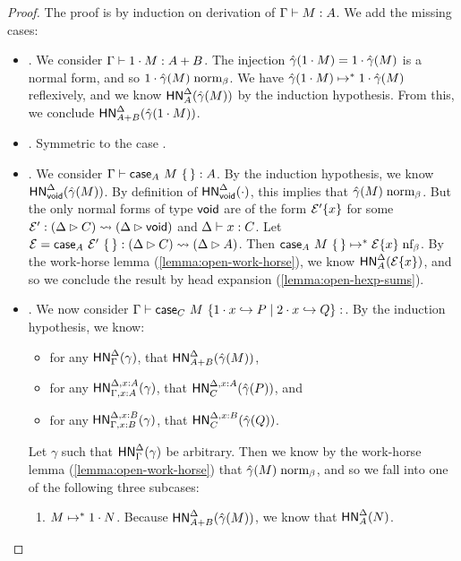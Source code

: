 \documentclass{article}
\begin{document}
\begin{proof}
  The proof is by induction on derivation of $\Gamma \vdash M : A$.
  We add the missing cases:
  \begin{itemize}
  \item {}. We consider $\Gamma \vdash 1\cdot M : A + B$.
    The injection $\hat\gamma(1\cdot M) = 1\cdot\hat\gamma(M)$ is a normal form, and so $1\cdot\hat\gamma(M) \mathrel{\text{norm}_\beta}$.
    We have $\hat\gamma(1\cdot M) \mapsto^* 1\cdot\hat\gamma(M)$ reflexively, and we know $\mathsf{HN}^{\Delta}_{A}(\hat\gamma(M))$ by the induction hypothesis.
    From this, we conclude $\mathsf{HN}^{\Delta}_{A + B}(\hat\gamma({1\cdot M}))$.
  \item {}. Symmetric to the case .
  \item {}. We consider $\Gamma \vdash \mathsf{case}_{A}\ M\ \{\,\} : A$.
    By the induction hypothesis, we know $\mathsf{HN}^{\Delta}_{\mathsf{void}}(\hat\gamma(M))$.
    By definition of $\mathsf{HN}^{\Delta}_{\mathsf{void}}(\cdot)$, this implies that $\hat\gamma(M) \mathrel{\text{norm}_\beta}$.
    But the only normal forms of type $\mathsf{void}$ are of the form $\mathcal{E}'\{x\}$ for some $\mathcal{E}' : (\Delta \rhd C) \leadsto (\Delta \rhd \mathsf{void})$ and $\Delta \vdash x : C$.
    Let $\mathcal{E} = \mathsf{case}_{A}\ \mathcal{E}'\ \{\,\} : (\Delta \rhd C) \leadsto (\Delta \rhd A)$.
    Then $\mathsf{case}_{A}\ M\ \{\,\} \mapsto^* \mathcal{E}\{x\} \mathrel{\text{nf}_\beta}$.
    By the work-horse lemma (\cref{lemma:open-work-horse}), we know $\mathsf{HN}^{\Delta}_{A}(\mathcal{E}\{x\})$, and so we conclude the result by head expansion (\cref{lemma:open-hexp-sums}).
  \item {}. We now consider $\hasEF{\Gamma}{\scase{C}{M}{x}{P}{Q}}$.
    By the induction hypothesis, we know:
    \begin{itemize}
    \item for any $\mathsf{HN}^{\Delta}_{\Gamma}(\gamma)$, that $\mathsf{HN}^{\Delta}_{A+B}(\hat\gamma(M))$,
    \item for any $\mathsf{HN}^{\Delta,x:A}_{\Gamma,x:A}(\gamma)$, that $\mathsf{HN}^{\Delta,x:A}_{C}(\hat\gamma(P))$, and
    \item for any $\mathsf{HN}^{\Delta,x:B}_{\Gamma,x:B}(\gamma)$, that $\mathsf{HN}^{\Delta,x:B}_{C}(\hat\gamma(Q))$.
    \end{itemize}
    Let $\gamma$ such that $\mathsf{HN}^{\Delta}_{\Gamma}(\gamma)$ be arbitrary.
    Then we know by the work-horse lemma (\cref{lemma:open-work-horse}) that $\hat\gamma(M) \mathrel{\text{norm}_\beta}$, and so we fall into one of the following three subcases:
    \begin{enumerate}
    \item $M \mapsto^* 1\cdot N$. Because $\mathsf{HN}^{\Delta}_{A+B}(\hat\gamma(M))$, we know that $\mathsf{HN}^{\Delta}_{A}(N)$.

\end{enumerate}
\end{itemize}
\end{proof}
\end{document}
